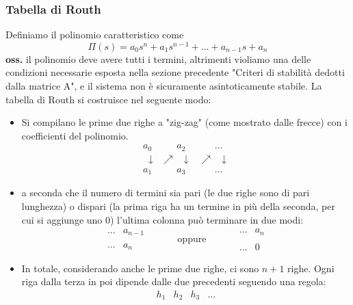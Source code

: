 \subsubsection*{Tabella di Routh}
Definiamo il polinomio caratteristico come
\[
    \Pi(s) = a_0s^n + a_1 s^{n-1} + \dots + a_{n-1}s + a_n
\]
\textbf{oss.} il polinomio deve avere tutti i termini, altrimenti violiamo una delle condizioni necessarie esposta nella sezione precedente "Criteri di stabilità dedotti dalla matrice A", e il sistema non è sicuramente asintoticamente stabile.\newline
\newline
La tabella di Routh si costruisce nel seguente modo:
\begin{itemize}
    \item Si compilano le prime due righe a "zig-zag" (come mostrato dalle frecce) con i coefficienti del polinomio.
    \[
        \begin{matrix}
            a_0 & \;\;\;\;\;\; a_2 & \;\;\;\;\;\;\dots\\
            \;\;\downarrow & \nearrow \;\; \downarrow & \nearrow \;\; \downarrow\\
            a_1 & \;\;\;\;\;\; a_3 & \;\;\;\;\;\;\dots 
        \end{matrix}
    \]
    \item a seconda che il numero di termini sia pari (le due righe sono di pari lunghezza) o dispari (la prima riga ha un termine in più della seconda, per cui si aggiunge uno $0$) l'ultima colonna può terminare in due modi:
    \[
        \begin{matrix}
            \dots & a_{n-1}\\
            \;\\
            \dots & a_n
        \end{matrix}\;\;\;\;\;\;\;\;\;\;\; \text{oppure}\;\;\;\;\;\;\;\;\;\;\; \begin{matrix}
            \dots &a_n\\
            \;\\
            \dots & 0 
        \end{matrix}
    \]
    \item In totale, considerando anche le prime due righe, ci sono $n+1$ righe.\newline
    Ogni riga dalla terza in poi dipende dalle due precedenti seguendo una regola:
    \[
        \begin{matrix}
            h_1 & h_2 & h_3 &\dots\\
            \;\\

\end{matrix}\]
\end{itemize}
